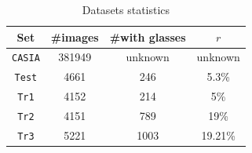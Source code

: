 \documentclass[a4paper]{article}
\begin{document}
	\begin{table}[H]
	\centering
	\begin{tabular}{|c|c||c|c|}
	\hline
	Set            & \#images & \#with glasses  & $r$\\
	\hline
	\texttt{CASIA} & 381949   &     unknown         &  unknown     \\
	\texttt{Test}  & 4661     &     246         &  5.3\%   \\
	\texttt{Tr1}   & 4152     &     214         &  5\%     \\
	\texttt{Tr2}   & 4151     &     789         &  19\%    \\
    \texttt{Tr3}   & 5221     &     1003        & 19.21\%\\
	\hline
	\end{tabular}
	\caption{Datasets statistics\label{datastat}}
	\end{table}
\end{document}
